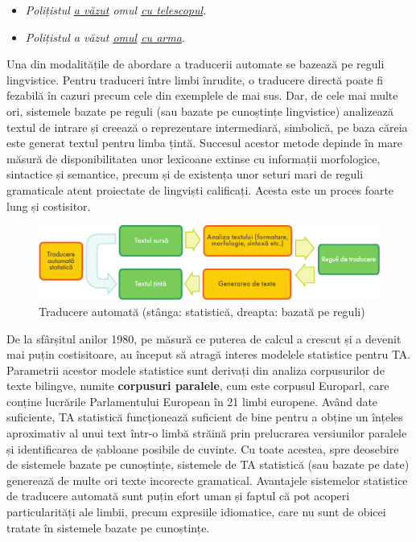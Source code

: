 \begin{multicols}{2}
\begin{itemize}
\item \textit{Polițistul \underline{a văzut} omul \underline{cu telescopul}.}
\item \textit{Polițistul a văzut \underline{omul} \underline{cu arma}.}
\end{itemize}

Una din modalitățile de abordare a traducerii automate se bazează pe reguli lingvistice. Pentru traduceri între limbi înrudite, o traducere directă poate fi fezabilă în cazuri precum cele din exemplele de mai sus. Dar, de cele mai multe ori, sistemele bazate pe reguli (sau bazate pe cunoștințe lingvistice) analizează textul de intrare și creează o reprezentare intermediară, simbolică, pe baza căreia este generat textul pentru limba țintă. Succesul acestor metode depinde în mare măsură de disponibilitatea unor lexicoane extinse cu informații morfologice, sintactice și semantice, precum și de existența unor seturi mari de reguli gramaticale atent proiectate de lingviști calificați. Acesta este un proces foarte lung și costisitor.

\begin{figure}[htb]
\center
\includegraphics[width=\textwidth]{../_media/romanian/machine_translation}
\caption{Traducere automată (stânga: statistică, dreapta: bazată pe reguli)}
\label{fig:mtarch_de}
\vspace{-15mm}
\end{figure}

De la sfârșitul anilor 1980, pe măsură ce puterea de calcul a crescut și a devenit mai puțin costisitoare, au început să atragă interes modelele statistice pentru TA. Parametrii acestor modele statistice sunt derivați din analiza corpusurilor de texte bilingve, numite \textbf{corpusuri paralele}, cum este corpusul Europarl, care conține lucrările Parlamentului European în 21 limbi europene. Având date suficiente, TA statistică funcționează suficient de bine pentru a obține un înțeles aproximativ al unui text într-o limbă străină prin prelucrarea versiunilor paralele și identificarea de șabloane posibile de cuvinte. Cu toate acestea, spre deosebire de sistemele bazate pe cunoștințe, sistemele de TA statistică (sau bazate pe date) generează de multe ori texte incorecte gramatical. Avantajele sistemelor statistice de traducere automată sunt puțin efort uman și faptul că pot acoperi particularități ale limbii, precum expresiile idiomatice, care nu sunt de obicei tratate în sistemele bazate pe cunoștințe.


\end{multicols}
